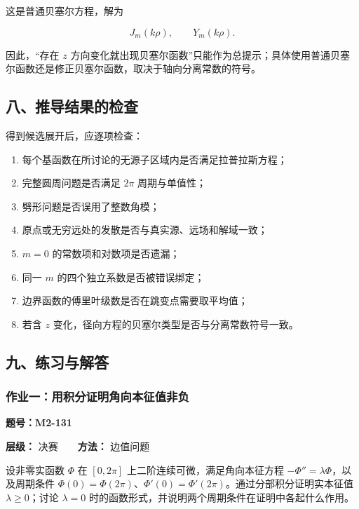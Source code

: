 这是普通贝塞尔方程，解为

\[
J_m(k\rho),
\qquad
Y_m(k\rho).
\]

因此，``存在 \(z\)
方向变化就出现贝塞尔函数''只能作为总提示；具体使用普通贝塞尔函数还是修正贝塞尔函数，取决于轴向分离常数的符号。

\subsection{八、推导结果的检查}\label{m2:ux516bux63a8ux5bfcux7ed3ux679cux7684ux68c0ux67e5}

得到候选展开后，应逐项检查：

\begin{enumerate}
\def\labelenumi{\arabic{enumi}.}
\tightlist
\item
  每个基函数在所讨论的无源子区域内是否满足拉普拉斯方程；
\item
  完整圆周问题是否满足 \(2\pi\) 周期与单值性；
\item
  劈形问题是否误用了整数角模；
\item
  原点或无穷远处的发散是否与真实源、远场和解域一致；
\item
  \(m=0\) 的常数项和对数项是否遗漏；
\item
  同一 \(m\) 的四个独立系数是否被错误绑定；
\item
  边界函数的傅里叶级数是否在跳变点需要取平均值；
\item
  若含 \(z\) 变化，径向方程的贝塞尔类型是否与分离常数符号一致。
\end{enumerate}

\subsection{九、练习与解答}\label{m2:ux4e5dux7ec3ux4e60ux4e0eux89e3ux7b54-3}

\subsubsection{作业一：用积分证明角向本征值非负}\label{m2:ux4f5cux4e1aux4e00ux7528ux79efux5206ux8bc1ux660eux89d2ux5411ux672cux5f81ux503cux975eux8d1f}

\textbf{题号：M2-131}

\textbf{层级：} 决赛　　\textbf{方法：} 边值问题

设非零实函数 \(\Phi\) 在 \([0,2\pi]\) 上二阶连续可微，满足角向本征方程
\(-\Phi''=\lambda\Phi\)，以及周期条件
\(\Phi(0)=\Phi(2\pi)\)、\(\Phi'(0)=\Phi'(2\pi)\)。通过分部积分证明实本征值
\(\lambda\ge0\)；讨论 \(\lambda=0\)
时的函数形式，并说明两个周期条件在证明中各起什么作用。

